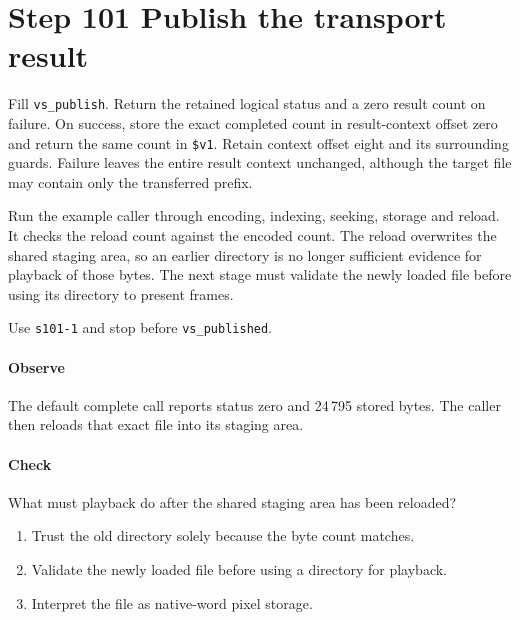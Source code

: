 \section{Step 101 Publish the transport result}
Fill \texttt{vs\_publish}. Return the retained logical status and a zero result count on failure. On success, store the exact completed count in result-context offset zero and return the same count in \texttt{\$v1}. Retain context offset eight and its surrounding guards. Failure leaves the entire result context unchanged, although the target file may contain only the transferred prefix.

Run the example caller through encoding, indexing, seeking, storage and reload. It checks the reload count against the encoded count. The reload overwrites the shared staging area, so an earlier directory is no longer sufficient evidence for playback of those bytes. The next stage must validate the newly loaded file before using its directory to present frames.

Use \texttt{s101-1} and stop before \texttt{vs\_published}.

\paragraph{Observe} The default complete call reports status zero and 24\,795 stored bytes. The caller then reloads that exact file into its staging area.

\paragraph{Check} What must playback do after the shared staging area has been reloaded?
\begin{enumerate}[label=\Alph*.]
\item Trust the old directory solely because the byte count matches.
\item Validate the newly loaded file before using a directory for playback.
\item Interpret the file as native-word pixel storage.
\end{enumerate}
